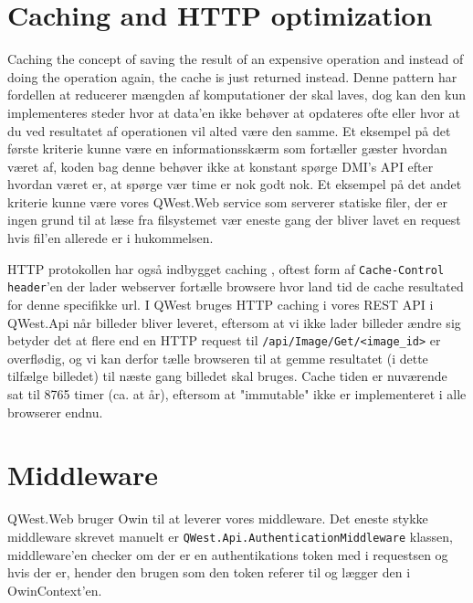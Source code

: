 \section{Caching and HTTP optimization}\label{sec:caching}
Caching the concept of saving the result of an expensive operation and instead of doing the operation again, the cache is just returned instead. Denne pattern har fordellen at reducerer mængden af komputationer der skal laves, dog kan den kun implementeres steder hvor at data'en ikke behøver at opdateres ofte eller hvor at du ved resultatet af operationen vil alted være den samme. Et eksempel på det første kriterie kunne være en informationsskærm som fortæller gæster hvordan været af, koden bag denne behøver ikke at konstant spørge DMI's API efter hvordan været er, at spørge vær time er nok godt nok. Et eksempel på det andet kriterie kunne være vores QWest.Web service som serverer statiske filer, der er ingen grund til at læse fra filsystemet vær eneste gang der bliver lavet en request hvis fil'en allerede er i hukommelsen.

HTTP protokollen har også indbygget caching \cite{HTTPcaching}, oftest form af \texttt{Cache-Control header}'en der lader webserver fortælle browsere hvor land tid de cache resultated for denne specifikke url. I QWest bruges HTTP caching i vores REST API i QWest.Api når billeder bliver leveret, eftersom at vi ikke lader billeder ændre sig betyder det at flere end en HTTP request til \texttt{/api/Image/Get/<image\_id>} er overflødig, og vi kan derfor tælle browseren til at gemme resultatet (i dette tilfælge billedet) til næste gang billedet skal bruges. Cache tiden er nuværende sat til 8765 timer (ca. at år), eftersom at "immutable" ikke er implementeret i alle browserer endnu.

\section{Middleware}\label{sec:middleware}
QWest.Web bruger Owin \cite{Owin} til at leverer vores middleware. Det eneste stykke middleware skrevet manuelt er \texttt{QWest.Api.AuthenticationMiddleware} klassen, middleware'en checker om der er en authentikations token med i requestsen og hvis der er, hender den brugen som den token referer til og lægger den i OwinContext'en. 